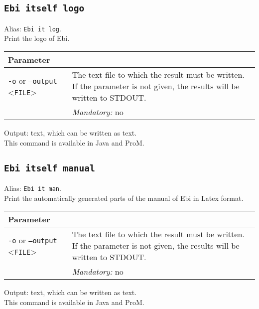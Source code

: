 {\subsection{\texttt{Ebi itself logo}}
\label{command:Ebi itself logo}
Alias: \texttt{Ebi it log}.\\
Print the logo of Ebi.\\
\begin{tabularx}{\linewidth}{lX}
\toprule
Parameter \\\midrule
\texttt{-o} or \texttt{--output} <\texttt{FILE}> &
The text file to which the result must be written. If the parameter is not given, the results will be written to STDOUT.\\
&\textit{Mandatory:} \quad no\\
\bottomrule
\end{tabularx}
\noindent Output: text, which can be written as  text.
\\This command is available in Java and ProM.
\subsection{\texttt{Ebi itself manual}}
\label{command:Ebi itself manual}
Alias: \texttt{Ebi it man}.\\
Print the automatically generated parts of the manual of Ebi in Latex format.\\
\begin{tabularx}{\linewidth}{lX}
\toprule
Parameter \\\midrule
\texttt{-o} or \texttt{--output} <\texttt{FILE}> &
The text file to which the result must be written. If the parameter is not given, the results will be written to STDOUT.\\
&\textit{Mandatory:} \quad no\\
\bottomrule
\end{tabularx}
\noindent Output: text, which can be written as  text.
\\This command is available in Java and ProM.
}
